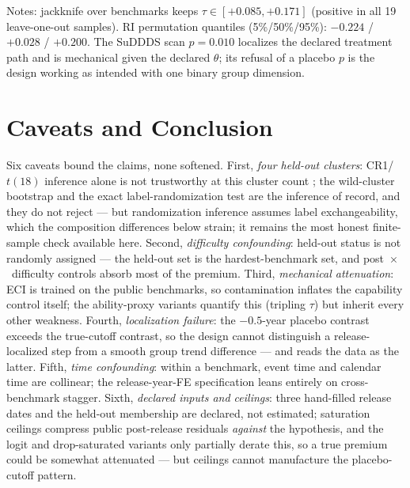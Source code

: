 \documentclass[11pt]{article}
\begin{document}
\begin{table}[t]
\medskip
\parbox{0.92\textwidth}{\footnotesize Notes: jackknife over benchmarks keeps
$\tau \in [+0.085, +0.171]$ (positive in all 19 leave-one-out samples). RI
permutation quantiles (5\%/50\%/95\%): $-0.224$ / $+0.028$ / $+0.200$. The
SuDDDS scan $p=0.010$ localizes the declared treatment path and is
mechanical given the declared $\theta$; its refusal of a placebo $p$ is the
design working as intended with one binary group dimension.}
\end{table}

\section{Caveats and Conclusion}\label{sec:conclusion}

Six caveats bound the claims, none softened. First, \emph{four held-out
clusters}: CR1/$t(18)$ inference alone is not trustworthy at this cluster
count \cite{cameron2015}; the wild-cluster bootstrap and the exact
label-randomization test are the inference of record, and they do not
reject --- but randomization inference assumes label exchangeability, which
the composition differences below strain; it remains the most honest
finite-sample check available here. Second, \emph{difficulty confounding}:
held-out status is not randomly assigned --- the held-out set is the
hardest-benchmark set, and post~$\times$~difficulty controls absorb most of
the premium. Third, \emph{mechanical attenuation}: ECI is trained on the
public benchmarks, so contamination inflates the capability control itself;
the ability-proxy variants quantify this (tripling $\tau$) but inherit every
other weakness. Fourth, \emph{localization failure}: the $-0.5$-year
placebo contrast exceeds the true-cutoff contrast, so the design cannot
distinguish a release-localized step from a smooth group trend difference
--- and reads the data as the latter. Fifth, \emph{time confounding}:
within a benchmark, event time and calendar time are collinear; the
release-year-FE specification leans entirely on cross-benchmark stagger.
Sixth, \emph{declared inputs and ceilings}: three hand-filled release dates
and the held-out membership are declared, not estimated; saturation
ceilings compress public post-release residuals \emph{against} the
hypothesis, and the logit and drop-saturated variants only partially derate
this, so a true premium could be somewhat attenuated --- but ceilings cannot
manufacture the placebo-cutoff pattern.
\end{document}
